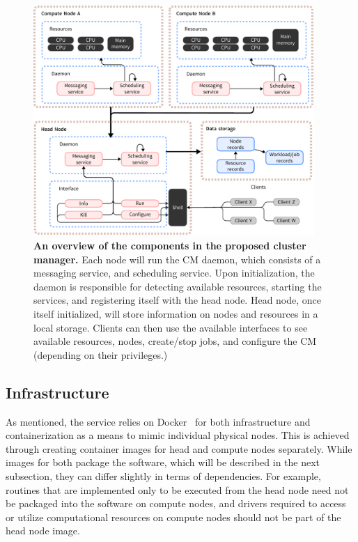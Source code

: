 \documentclass[sigconf]{acmart}
\begin{document}
\begin{figure}[ht]
    \centering
    \includegraphics[width=0.95\textwidth]{figures/overview.pdf}
    \caption{
        \textbf{An overview of the components in the proposed cluster manager.}
        Each node will run the CM daemon, which consists of a messaging service, and scheduling service.
        Upon initialization, the daemon is responsible for detecting available resources, starting the services, and registering
        itself with the head node. Head node, once itself initialized, will store information on nodes and resources in a local
        storage. Clients can then use the available interfaces to see available resources, nodes, create/stop jobs, and
        configure the CM (depending on their privileges.)
    }
    \label{fig:overview}
\end{figure}

\subsection{Infrastructure}
As mentioned, the service relies on Docker~\cite{merkel2014docker} for both infrastructure and containerization as a means to
mimic individual physical nodes.
This is achieved through creating container images for head and compute nodes separately.
While images for both package the software, which will be described in the next subsection, they can differ slightly in terms of
dependencies. For example, routines that are implemented only to be executed from the head node need not be packaged into the
software on compute nodes, and drivers required to access or utilize computational resources on compute nodes should not be part
of the head node image.
\end{document}
